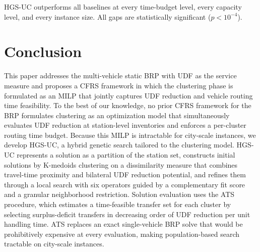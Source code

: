 \documentclass[11pt]{article}
\numberwithin{table}{section}
\numberwithin{figure}{section}
\begin{document}
HGS-UC outperforms all baselines at every time-budget level, every capacity level, and every instance size. All gaps are statistically significant ($p<10^{-4}$).

\section{Conclusion}

This paper addresses the multi-vehicle static BRP with UDF as the service measure and proposes a CFRS framework in which the clustering phase is formulated as an MILP that jointly captures UDF reduction and vehicle routing time feasibility. To the best of our knowledge, no prior CFRS framework for the BRP formulates clustering as an optimization model that simultaneously evaluates UDF reduction at station-level inventories and enforces a per-cluster routing time budget. Because this MILP is intractable for city-scale instances, we develop HGS-UC, a hybrid genetic search tailored to the clustering model. HGS-UC represents a solution as a partition of the station set, constructs initial solutions by K-medoids clustering on a dissimilarity measure that combines travel-time proximity and bilateral UDF reduction potential, and refines them through a local search with six operators guided by a complementary fit score and a granular neighborhood restriction. Solution evaluation uses the ATS procedure, which estimates a time-feasible transfer set for each cluster by selecting surplus-deficit transfers in decreasing order of UDF reduction per unit handling time. ATS replaces an exact single-vehicle BRP solve that would be prohibitively expensive at every evaluation, making population-based search tractable on city-scale instances.
\end{document}
